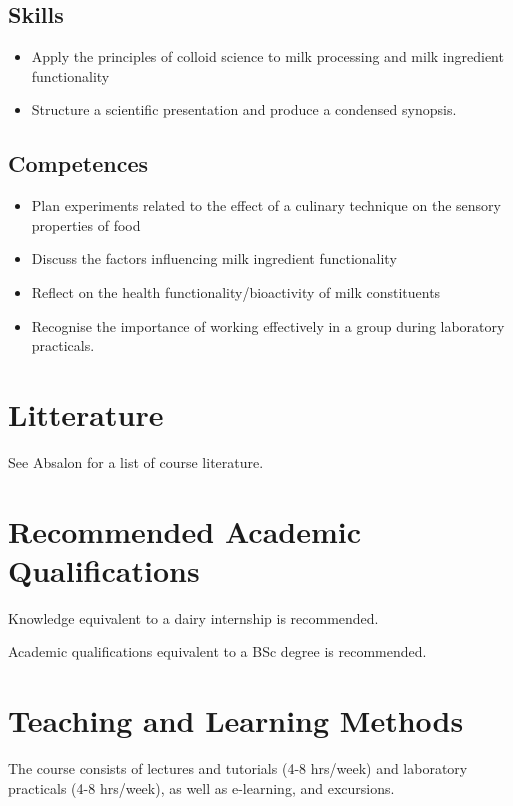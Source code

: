 \subsection{Skills}
\begin{highlight}
    \begin{itemize}
        \item Apply the principles of colloid science to milk processing and milk ingredient functionality
        \item Structure a scientific presentation and produce a condensed synopsis.
\end{itemize}
\end{highlight} 

\subsection{Competences}  
\begin{highlight}
    \begin{itemize}
        \item Plan experiments related to the effect of a culinary technique on the sensory properties of food
        \item Discuss the factors influencing milk ingredient functionality
        \item Reflect on the health functionality/bioactivity of milk constituents
        \item Recognise the importance of working effectively in a group during laboratory practicals.
    \end{itemize}
\end{highlight}

\section{Litterature}
See Absalon for a list of course literature.

\section{Recommended Academic Qualifications}
Knowledge equivalent to a dairy internship is recommended.

Academic qualifications equivalent to a BSc degree is recommended.

\section{Teaching and Learning Methods}
The course consists of lectures and tutorials (4-8 hrs/week) and laboratory practicals (4-8 hrs/week), as well as e-learning, and excursions.

